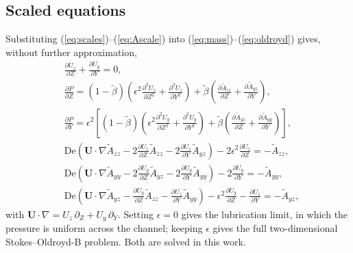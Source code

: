 \documentclass[11pt,a4paper]{article}
\newcommand{\De}{\mathrm{De}}
\newcommand{\bt}{\tilde\beta}
\begin{document}
\subsection{Scaled equations}
Substituting (\ref{eq:scales})--(\ref{eq:Ascale}) into (\ref{eq:mass})--(\ref{eq:oldroyd}) gives, without further approximation,
\begin{align}
&\frac{\partial U_z}{\partial Z}+\frac{\partial U_y}{\partial Y}=0, \label{eq:s_mass}\\
&\frac{\partial P}{\partial Z}=(1-\bt)\left(\epsilon^2\frac{\partial^2U_z}{\partial Z^2}+\frac{\partial^2U_z}{\partial Y^2}\right)+\bt\left(\frac{\partial\tilde A_{zz}}{\partial Z}+\frac{\partial\tilde A_{yz}}{\partial Y}\right), \label{eq:s_zmom}\\
&\frac{\partial P}{\partial Y}=\epsilon^2\left[(1-\bt)\left(\epsilon^2\frac{\partial^2U_y}{\partial Z^2}+\frac{\partial^2U_y}{\partial Y^2}\right)+\bt\left(\frac{\partial\tilde A_{yz}}{\partial Z}+\frac{\partial\tilde A_{yy}}{\partial Y}\right)\right], \label{eq:s_ymom}\\
&\De\left(\mathbf U\cdot\nabla\tilde A_{zz}-2\frac{\partial U_z}{\partial Z}\tilde A_{zz}-2\frac{\partial U_z}{\partial Y}\tilde A_{yz}\right)-2\epsilon^2\frac{\partial U_z}{\partial Z}=-\tilde A_{zz}, \label{eq:s_azz}\\
&\De\left(\mathbf U\cdot\nabla\tilde A_{yy}-2\frac{\partial U_y}{\partial Z}\tilde A_{yz}-2\frac{\partial U_y}{\partial Y}\tilde A_{yy}\right)-2\frac{\partial U_y}{\partial Y}=-\tilde A_{yy}, \label{eq:s_ayy}\\
&\De\left(\mathbf U\cdot\nabla\tilde A_{yz}-\frac{\partial U_y}{\partial Z}\tilde A_{zz}-\frac{\partial U_z}{\partial Y}\tilde A_{yy}\right)-\epsilon^2\frac{\partial U_y}{\partial Z}-\frac{\partial U_z}{\partial Y}=-\tilde A_{yz}, \label{eq:s_ayz}
\end{align}
with $\mathbf U\cdot\nabla=U_z\,\partial_Z+U_y\,\partial_Y$. Setting $\epsilon=0$ gives the lubrication limit, in which the pressure is uniform across the channel; keeping $\epsilon$ gives the full two-dimensional Stokes--Oldroyd-B problem. Both are solved in this work.
\end{document}
